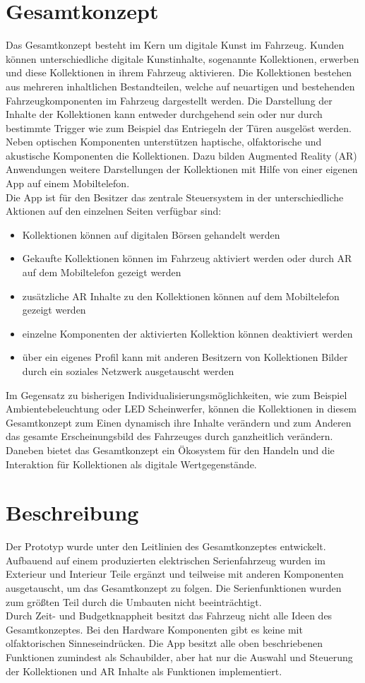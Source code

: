 \section{Gesamtkonzept}
Das Gesamtkonzept besteht im Kern um digitale Kunst im Fahrzeug. Kunden können unterschiedliche digitale Kunstinhalte, sogenannte Kollektionen, erwerben und diese Kollektionen in ihrem Fahrzeug aktivieren. Die Kollektionen bestehen aus mehreren inhaltlichen Bestandteilen, welche auf neuartigen und bestehenden Fahrzeugkomponenten im Fahrzeug dargestellt werden. Die Darstellung der Inhalte der Kollektionen kann entweder durchgehend sein oder nur durch bestimmte Trigger wie zum Beispiel das Entriegeln der Türen ausgelöst werden.
Neben optischen Komponenten unterstützen haptische, olfaktorische und akustische Komponenten die Kollektionen. Dazu bilden Augmented Reality (AR) Anwendungen weitere Darstellungen der Kollektionen mit Hilfe von einer eigenen App auf einem Mobiltelefon.\\
Die App ist für den Besitzer das zentrale Steuersystem in der unterschiedliche Aktionen auf den einzelnen Seiten verfügbar sind:
\begin{itemize}
	\item Kollektionen können auf digitalen Börsen gehandelt werden
	\item Gekaufte Kollektionen können im Fahrzeug aktiviert werden oder durch AR auf dem Mobiltelefon gezeigt werden
	\item zusätzliche AR Inhalte zu den Kollektionen können auf dem Mobiltelefon gezeigt werden
	\item einzelne Komponenten der aktivierten Kollektion können deaktiviert werden
	\item über ein eigenes Profil kann mit anderen Besitzern von Kollektionen Bilder durch ein soziales Netzwerk ausgetauscht werden
\end{itemize}
Im Gegensatz zu bisherigen Individualisierungsmöglichkeiten, wie zum Beispiel Ambientebeleuchtung oder LED Scheinwerfer, können die Kollektionen in diesem Gesamtkonzept zum Einen dynamisch ihre Inhalte verändern und zum Anderen das gesamte Erscheinungsbild des Fahrzeuges durch ganzheitlich verändern. Daneben bietet das Gesamtkonzept ein Ökosystem für den Handeln und die Interaktion für Kollektionen als digitale Wertgegenstände.
\section{Beschreibung}
Der Prototyp wurde unter den Leitlinien des Gesamtkonzeptes entwickelt. Aufbauend auf einem produzierten elektrischen Serienfahrzeug wurden im Exterieur und Interieur Teile ergänzt und teilweise mit anderen Komponenten ausgetauscht, um das Gesamtkonzept zu folgen. Die Serienfunktionen wurden zum größten Teil durch die Umbauten nicht beeinträchtigt.\\
Durch Zeit- und Budgetknappheit besitzt das Fahrzeug nicht alle Ideen des Gesamtkonzeptes. Bei den Hardware Komponenten gibt es keine mit olfaktorischen Sinneseindrücken. Die App besitzt alle oben beschriebenen Funktionen zumindest als Schaubilder, aber hat nur die Auswahl und Steuerung der Kollektionen und AR Inhalte als Funktionen implementiert.
